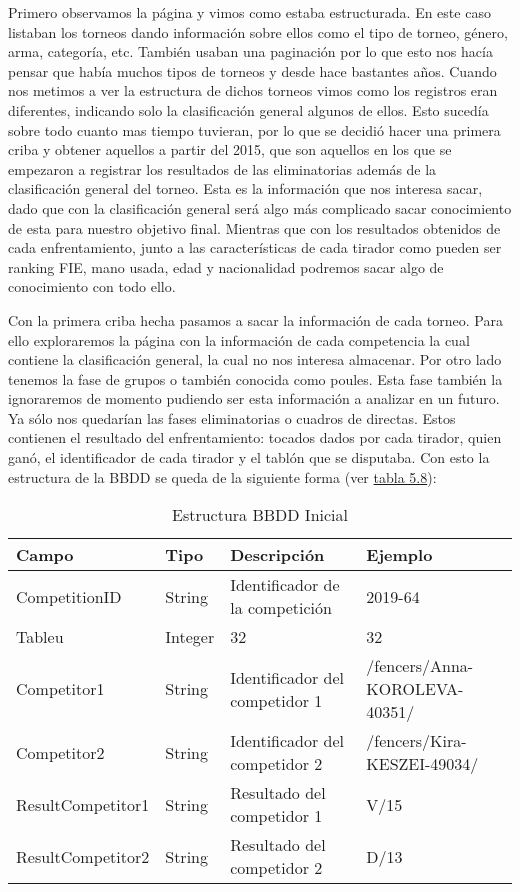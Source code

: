 Primero observamos la página y vimos como estaba estructurada. En este caso listaban
los torneos dando información sobre ellos como el tipo de torneo, género, arma, categoría,
etc. También usaban una paginación por lo que esto nos hacía pensar que había muchos tipos
de torneos y desde hace bastantes años. Cuando nos metimos a ver la estructura de dichos torneos
vimos como los registros eran diferentes, indicando solo la clasificación general algunos de ellos.
Esto sucedía sobre todo cuanto mas tiempo tuvieran, por lo que se decidió hacer una primera
criba y obtener aquellos a partir del 2015, que son aquellos en los que se empezaron a registrar
los resultados de las eliminatorias además de la clasificación general del torneo. Esta es la
información que nos interesa sacar, dado que con la clasificación general será algo más
complicado sacar conocimiento de esta para nuestro objetivo final. Mientras que con los
resultados obtenidos de cada enfrentamiento, junto a las características de cada tirador
como pueden ser ranking FIE, mano usada, edad y nacionalidad podremos sacar algo de
conocimiento con todo ello.

Con la primera criba hecha pasamos a sacar la información de cada torneo. Para ello exploraremos
la página con la información de cada competencia la cual contiene la clasificación general,
la cual no nos interesa almacenar. Por otro lado tenemos la fase de grupos o también
conocida como poules. Esta fase también la ignoraremos de momento pudiendo ser esta
información a analizar en un futuro. Ya sólo nos quedarían las fases eliminatorias o
cuadros de directas. Estos contienen el resultado del enfrentamiento: tocados dados por cada tirador,
quien ganó, el identificador de cada tirador y el tablón que se disputaba. Con esto la estructura de la BBDD
se queda de la siguiente forma (ver \hyperref[tab:Estructura BBDD Inicial iteracion5]{tabla 5.8}):

\begin{table}[]
  \centering
  \caption{Estructura BBDD Inicial}
  \label{tab:Estructura BBDD Inicial iteracion5}
  \begin{tabular}{|llll|}
    \hline \rowcolor[HTML]{C0C0C0}
    Campo & Tipo & Descripción & Ejemplo \\ \hline
    CompetitionID & String & Identificador de la competición & 2019-64 \\ \hline
    Tableu & Integer & 32 & 32 \\ \hline
    Competitor1 & String & Identificador del competidor 1 & /fencers/Anna-KOROLEVA-40351/ \\ \hline
    Competitor2 & String & Identificador del competidor 2 & /fencers/Kira-KESZEI-49034/ \\ \hline
    ResultCompetitor1 & String & Resultado del competidor 1 & V/15 \\ \hline
    ResultCompetitor2 & String & Resultado del competidor 2 & D/13 \\ \hline
  \end{tabular}
\end{table}

